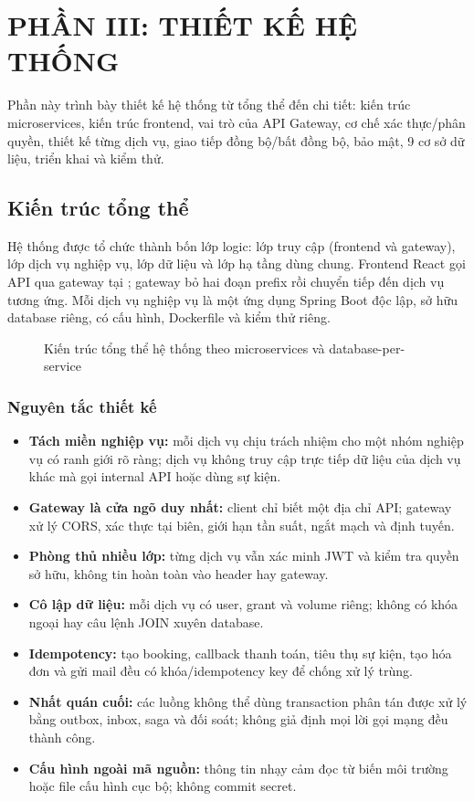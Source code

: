 \chapter{PHẦN III: THIẾT KẾ HỆ THỐNG}
\label{chap:thiet-ke}

Phần này trình bày thiết kế hệ thống từ tổng thể đến chi tiết: kiến trúc microservices, kiến trúc frontend, vai trò của API Gateway, cơ chế xác thực/phân quyền, thiết kế từng dịch vụ, giao tiếp đồng bộ/bất đồng bộ, bảo mật, 9 cơ sở dữ liệu, triển khai và kiểm thử.

\section{Kiến trúc tổng thể}
\label{sec:kien-truc-tong-the}

Hệ thống được tổ chức thành bốn lớp logic: lớp truy cập (frontend và gateway), lớp dịch vụ nghiệp vụ, lớp dữ liệu và lớp hạ tầng dùng chung. Frontend React gọi API qua gateway tại ; gateway bỏ hai đoạn prefix  rồi chuyển tiếp đến dịch vụ tương ứng. Mỗi dịch vụ nghiệp vụ là một ứng dụng Spring Boot độc lập, sở hữu database riêng, có cấu hình, Dockerfile và kiểm thử riêng.

\begin{figure}[H]
\centering
\resizebox{\textwidth}{!}{}
\caption{Kiến trúc tổng thể hệ thống theo microservices và database-per-service}
\label{fig:kien-truc}
\end{figure}

\subsection{Nguyên tắc thiết kế}

\begin{itemize}
  \item \textbf{Tách miền nghiệp vụ:} mỗi dịch vụ chịu trách nhiệm cho một nhóm nghiệp vụ có ranh giới rõ ràng; dịch vụ không truy cập trực tiếp dữ liệu của dịch vụ khác mà gọi internal API hoặc dùng sự kiện.
  \item \textbf{Gateway là cửa ngõ duy nhất:} client chỉ biết một địa chỉ API; gateway xử lý CORS, xác thực tại biên, giới hạn tần suất, ngắt mạch và định tuyến.
  \item \textbf{Phòng thủ nhiều lớp:} từng dịch vụ vẫn xác minh JWT và kiểm tra quyền sở hữu, không tin hoàn toàn vào header hay gateway.
  \item \textbf{Cô lập dữ liệu:} mỗi dịch vụ có user, grant và volume riêng; không có khóa ngoại hay câu lệnh JOIN xuyên database.
  \item \textbf{Idempotency:} tạo booking, callback thanh toán, tiêu thụ sự kiện, tạo hóa đơn và gửi mail đều có khóa/idempotency key để chống xử lý trùng.
  \item \textbf{Nhất quán cuối:} các luồng không thể dùng transaction phân tán được xử lý bằng outbox, inbox, saga và đối soát; không giả định mọi lời gọi mạng đều thành công.
  \item \textbf{Cấu hình ngoài mã nguồn:} thông tin nhạy cảm đọc từ biến môi trường hoặc file cấu hình cục bộ; không commit secret.
\end{itemize}

